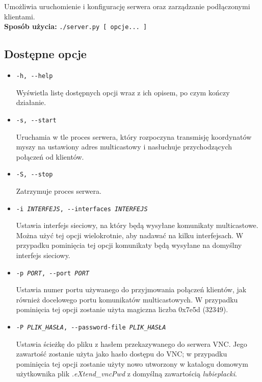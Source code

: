   Umożliwia uruchomienie i konfigurację serwera oraz zarządzanie podłączonymi klientami. \\

  \textbf{Sposób użycia:}
  \texttt{./server.py [ opcje... ]}

  \subsection{Dostępne opcje}

  \begin{itemize}
    \item \texttt{-h, -{}-help}

      Wyświetla listę dostępnych opcji wraz z ich opisem, po czym kończy działanie.

    \item \texttt{-s, -{}-start}

      Uruchamia w tle proces serwera, który rozpoczyna transmisję koordynatów myszy na ustawiony adres multicastowy i nasłuchuje przychodzących połączeń od klientów.

    \item \texttt{-S, -{}-stop}

      Zatrzymuje proces serwera.

    \item \texttt{-i \emph{INTERFEJS}, -{}-interfaces \emph{INTERFEJS}}

      Ustawia interfejs sieciowy, na który będą wysyłane komunikaty multicastowe. Można użyć tej opcji wielokrotnie, aby nadawać na kilku interfejsach. W przypadku pominięcia tej opcji komunikaty będą wysyłane na domyślny interfejs sieciowy.

    \item \texttt{-p \emph{PORT}, -{}-port \emph{PORT}}

      Ustawia numer portu używanego do przyjmowania połączeń klientów, jak również docelowego portu komunikatów multicastowych. W przypadku pominięcia tej opcji zostanie użyta magiczna liczba 0x7e5d (32349).

    \item \texttt{-P \emph{PLIK\_HASŁA}, -{}-password-file \emph{PLIK\_HASŁA}}

      Ustawia ścieżkę do pliku z hasłem przekazywanego do serwera VNC. Jego zawartość zostanie użyta jako hasło dostępu do VNC; w przypadku pominięcia tej opcji zostanie użyty nowo utworzony w katalogu domowym użytkownika plik \emph{.eXtend\_vncPwd} z domyślną zawartością \emph{lubieplacki}.


\end{itemize}
